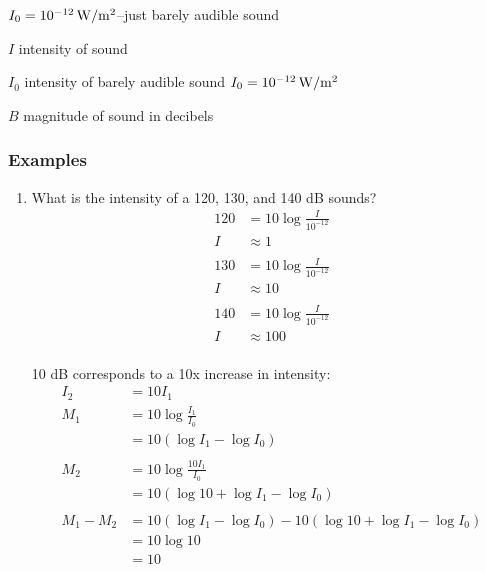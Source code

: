 \documentclass{exam}
\begin{document}
  $I_0 = \unit[10^{-12}]{W/m^2}$--just barely audible sound 

  \begin{itemize*}
    \item $I$ intensity of sound 
    \item $I_0$ intensity of barely audible sound $I_0 = \unit[10^{-12}]{W/m^2}$
    \item $B$ magnitude of sound in decibels
  \end{itemize*}

  \subsubsection{Examples}
  \begin{enumerate}

    \item What is the intensity of a 120, 130, and 140 dB sounds?
      \begin{align*}
        120 & = 10 \log \frac{I}{10^{-12}} \\
        I   & \approx 1 \\
        \\
        130 & = 10 \log \frac{I}{10^{-12}} \\
        I   & \approx 10 \\
        \\
        140 & = 10 \log \frac{I}{10^{-12}} \\
        I   & \approx 100 \\
      \end{align*}

      10 dB corresponds to a 10x increase in intensity:
      \begin{align*}
        I_2       &= 10 I_1 \\
        M_1       &= 10 \log \frac{I_1}{I_0} \\
                  &= 10 (\log I_1 - \log I_0 ) \\
        \\
        M_2       &= 10 \log \frac{10 I_1}{I_0} \\
                  &= 10 (\log 10 + \log I_1 - \log I_0 ) \\
        \\
        M_1 - M_2 &= 10 (\log I_1 - \log I_0 ) - 10 (\log 10 + \log I_1 - \log I_0 ) \\
                  &= 10 \log 10 \\
                  &= 10 \\
      \end{align*}


\end{enumerate}
\end{document}
